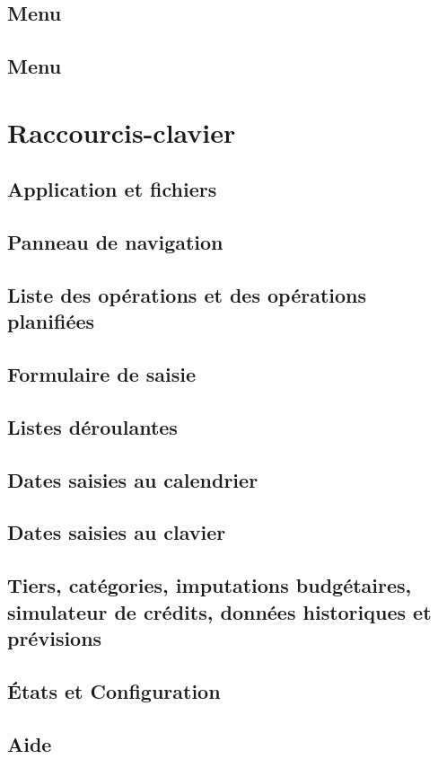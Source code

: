 \subsection{Menu \label{home-menus-display}}


\subsection{Menu \label{home-menus-help}}



\section{Raccourcis-clavier\label{home-shortcuts}}



\subsection{Application et fichiers}

\subsection{Panneau de navigation}

\subsection{Liste des opérations et des opérations planifiées}

\subsection{Formulaire de saisie }

\subsection{Listes déroulantes}

\subsection{Dates saisies au calendrier}

\subsection{Dates saisies au clavier}

\subsection{Tiers, catégories, imputations budgétaires, simulateur de crédits, données historiques et prévisions}


\subsection{États et Configuration}

\subsection{Aide}















